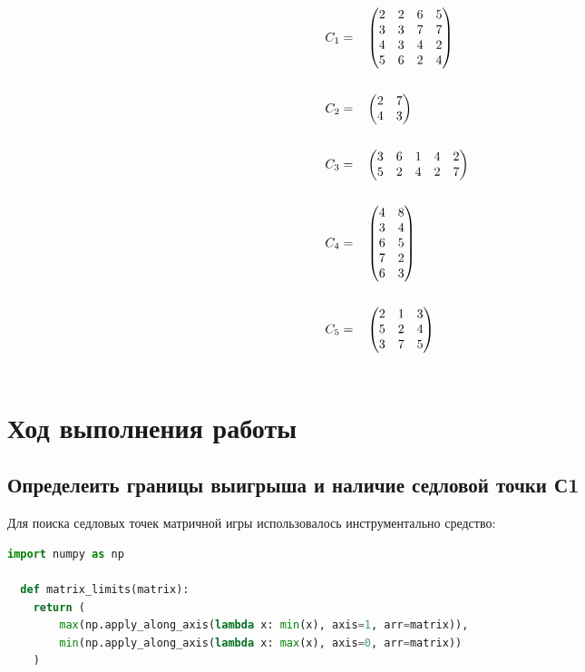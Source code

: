 \documentclass[12pt,a4paper]{article}%
\begin{document}
$$
\begin{aligned}
  C_1 &= &&
  \begin{pmatrix}
    2 & 2 & 6 & 5 \\
    3 & 3 & 7 & 7 \\
    4 & 3 & 4 & 2 \\
    5 & 6 & 2 & 4
  \end{pmatrix} \\ \vspace{0.5cm}\\
  C_2 &= &&
  \begin{pmatrix}
    2 & 7 \\
    4 & 3 
  \end{pmatrix} \\ \vspace{0.5cm}\\
  C_3 &= &&
  \begin{pmatrix}
    3 & 6 & 1 & 4 & 2 \\
    5 & 2 & 4 & 2 & 7
  \end{pmatrix} \\ \vspace{0.5cm}\\
  C_4 &= &&
  \begin{pmatrix}
    4 & 8 \\
    3 & 4 \\
    6 & 5 \\
    7 & 2 \\
    6 & 3 
  \end{pmatrix} \\ \vspace{0.5cm}\\
  C_5 &= &&
  \begin{pmatrix}
    2 & 1 & 3 \\
    5 & 2 & 4 \\
    3 & 7 & 5 
  \end{pmatrix} \\ \vspace{0.5cm}\\
\end{aligned}
$$

\pagebreak

\section{Ход выполнения работы}

\subsection{Определеить границы выигрыша и наличие седловой точки С1}
Для поиска седловых точек матричной игры использовалось инструментально средство:
\begin{lstlisting}[language=Python]
  import numpy as np

  def matrix_limits(matrix):
    return (
        max(np.apply_along_axis(lambda x: min(x), axis=1, arr=matrix)),
        min(np.apply_along_axis(lambda x: max(x), axis=0, arr=matrix))
    )
\end{lstlisting}
\end{document}
